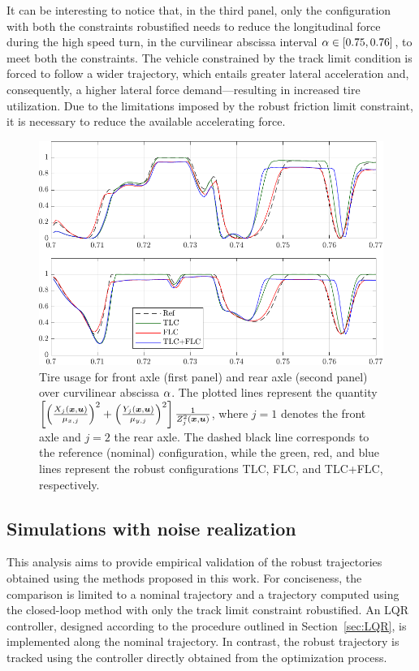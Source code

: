 It can be interesting to notice that, in the third panel, only the configuration with both the constraints robustified needs to reduce the longitudinal force during the high speed turn, in the curvilinear abscissa interval $\alpha\in\left[0.75, 0.76\right]$, to meet both the constraints. 
The vehicle constrained by the track limit condition is forced to follow a wider trajectory, which entails greater lateral acceleration and, consequently, a higher lateral force demand---resulting in increased tire utilization. Due to the limitations imposed by the robust friction limit constraint, it is necessary to reduce the available accelerating force.

\begin{figure}
	\centering
	\includegraphics{Fig/ol_saturation.pdf}
	\caption{Tire usage for front axle (first panel) and rear axle (second panel) over curvilinear abscissa $\alpha$. The plotted lines represent the quantity $\left[ \left( \frac{X_j(\boldsymbol{x},\boldsymbol{u})}{\mu_{x,j}} \right)^2+ \left( \frac{Y_j(\boldsymbol{x},\boldsymbol{u})}{\mu_{y,j}}\right)^2\right]\frac{1}{Z_j^2(\boldsymbol{x},\boldsymbol{u})}$, where $j=1$ denotes the front axle and $j=2$ the rear axle. The dashed black line corresponds to the reference (nominal) configuration, while the green, red, and blue lines represent the robust configurations TLC, FLC, and TLC+FLC, respectively.}
	\label{fig:ol_saturation}
\end{figure}

\subsection{Simulations with noise realization}
This analysis aims to provide empirical validation of the robust trajectories obtained using the methods proposed in this work. For conciseness, the comparison is limited to a nominal trajectory and a trajectory computed using the closed-loop method with only the track limit constraint robustified.
An LQR controller, designed according to the procedure outlined in Section~\ref{sec:LQR}, is implemented along the nominal trajectory. In contrast, the robust trajectory is tracked using the controller directly obtained from the optimization process.

